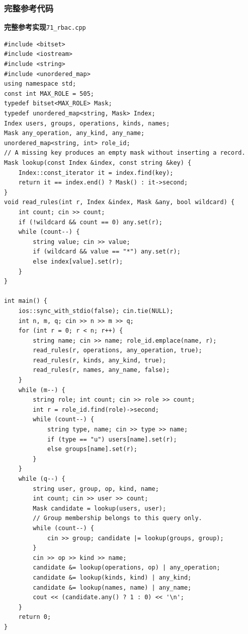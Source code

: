 \documentclass[UTF8,11pt,a4paper,fontset=none]{ctexart}
\begin{document}
\subsubsection{完整参考代码}
\par\noindent\begin{minipage}{\linewidth}
\textbf{完整参考实现}\quad\texttt{71\_rbac.cpp}
\begin{lstlisting}
#include <bitset>
#include <iostream>
#include <string>
#include <unordered_map>
using namespace std;
const int MAX_ROLE = 505;
typedef bitset<MAX_ROLE> Mask;
typedef unordered_map<string, Mask> Index;
Index users, groups, operations, kinds, names;
Mask any_operation, any_kind, any_name;
unordered_map<string, int> role_id;
// A missing key produces an empty mask without inserting a record.
Mask lookup(const Index &index, const string &key) {
    Index::const_iterator it = index.find(key);
    return it == index.end() ? Mask() : it->second;
}
void read_rules(int r, Index &index, Mask &any, bool wildcard) {
    int count; cin >> count;
    if (!wildcard && count == 0) any.set(r);
    while (count--) {
        string value; cin >> value;
        if (wildcard && value == "*") any.set(r);
        else index[value].set(r);
    }
}

int main() {
    ios::sync_with_stdio(false); cin.tie(NULL);
    int n, m, q; cin >> n >> m >> q;
    for (int r = 0; r < n; r++) {
        string name; cin >> name; role_id.emplace(name, r);
        read_rules(r, operations, any_operation, true);
        read_rules(r, kinds, any_kind, true);
        read_rules(r, names, any_name, false);
    }
    while (m--) {
        string role; int count; cin >> role >> count;
        int r = role_id.find(role)->second;
        while (count--) {
            string type, name; cin >> type >> name;
            if (type == "u") users[name].set(r);
            else groups[name].set(r);
        }
    }
    while (q--) {
        string user, group, op, kind, name;
        int count; cin >> user >> count;
        Mask candidate = lookup(users, user);
        // Group membership belongs to this query only.
        while (count--) {
            cin >> group; candidate |= lookup(groups, group);
        }
        cin >> op >> kind >> name;
        candidate &= lookup(operations, op) | any_operation;
        candidate &= lookup(kinds, kind) | any_kind;
        candidate &= lookup(names, name) | any_name;
        cout << (candidate.any() ? 1 : 0) << '\n';
    }
    return 0;
}
\end{lstlisting}
\end{minipage}\par
\end{document}
